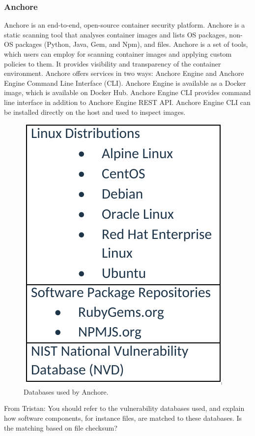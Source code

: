 \documentclass[a4paper,num-refs]{oup-contemporary}
\newcommand{\TG}[1]{\color{blue}From Tristan: #1\color{black}}
\begin{document}
\subsubsection{Anchore}

Anchore is an end-to-end, open-source container security platform. Anchore
is a static
scanning tool that analyses container images and lists OS
packages, non-OS packages (Python, Java, Gem, and Npm), and files.
Anchore is a set of tools, which users can
employ for scanning container images and applying custom policies to them.
It provides visibility and transparency of the container environment.
Anchore offers services in two ways: Anchore Engine and Anchore Engine
Command Line Interface (CLI). Anchore Engine is available as a Docker
image, which is available on Docker Hub. Anchore Engine CLI provides
command line interface in addition to Anchore Engine REST API. Anchore
Engine CLI can be installed directly on the host and used to inspect
images.

\begin{figure}
  \centering
  \includegraphics[width=.7\columnwidth]{Figures/anchore.png}
  \caption{Databases used by Anchore.}
        \label{fig:anchore_db}
\end{figure}


\TG{You should refer to the vulnerability databases used, and explain how
software components, for instance files, are matched to these databases. Is
the matching based on file checksum?}
\end{document}
